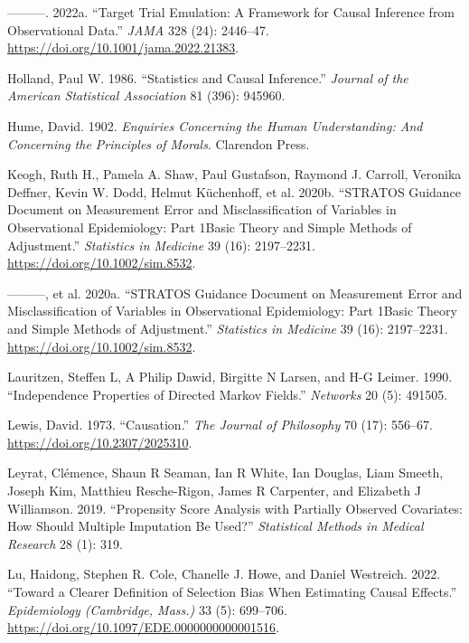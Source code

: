 \documentclass[
  singlecolumn]{report}
\newlength{\cslhangindent}
\newlength{\cslentryspacingunit} %
\newenvironment{CSLReferences}[2] %
 {%
  \setlength{\parindent}{0pt}
  \ifodd #1
  \let\oldpar\par
  \def\par{\hangindent=\cslhangindent\oldpar}
  \fi
  \setlength{\parskip}{#2\cslentryspacingunit}
 }%
 {}
\begin{document}
\begin{CSLReferences}{1}{0}
\leavevmode{}%
---------. 2022a. {``Target Trial Emulation: A Framework for Causal
Inference from Observational Data.''} \emph{JAMA} 328 (24): 2446--47.
\url{https://doi.org/10.1001/jama.2022.21383}.

\leavevmode{}%
Holland, Paul W. 1986. {``Statistics and Causal Inference.''}
\emph{Journal of the American Statistical Association} 81 (396): 945960.

\leavevmode{}%
Hume, David. 1902. \emph{Enquiries Concerning the Human Understanding:
And Concerning the Principles of Morals}. Clarendon Press.

\leavevmode{}%
Keogh, Ruth H., Pamela A. Shaw, Paul Gustafson, Raymond J. Carroll,
Veronika Deffner, Kevin W. Dodd, Helmut Küchenhoff, et al. 2020b.
{``STRATOS Guidance Document on Measurement Error and Misclassification
of Variables in Observational Epidemiology: Part 1{\textemdash}Basic
Theory and Simple Methods of Adjustment.''} \emph{Statistics in
Medicine} 39 (16): 2197--2231. \url{https://doi.org/10.1002/sim.8532}.

\leavevmode{}%
---------, et al. 2020a. {``STRATOS Guidance Document on Measurement
Error and Misclassification of Variables in Observational Epidemiology:
Part 1{\textemdash}Basic Theory and Simple Methods of Adjustment.''}
\emph{Statistics in Medicine} 39 (16): 2197--2231.
\url{https://doi.org/10.1002/sim.8532}.

\leavevmode{}%
Lauritzen, Steffen L, A Philip Dawid, Birgitte N Larsen, and H-G Leimer.
1990. {``Independence Properties of Directed Markov Fields.''}
\emph{Networks} 20 (5): 491505.

\leavevmode{}%
Lewis, David. 1973. {``Causation.''} \emph{The Journal of Philosophy} 70
(17): 556--67. \url{https://doi.org/10.2307/2025310}.

\leavevmode{}%
Leyrat, Clémence, Shaun R Seaman, Ian R White, Ian Douglas, Liam Smeeth,
Joseph Kim, Matthieu Resche-Rigon, James R Carpenter, and Elizabeth J
Williamson. 2019. {``Propensity Score Analysis with Partially Observed
Covariates: How Should Multiple Imputation Be Used?''} \emph{Statistical
Methods in Medical Research} 28 (1): 319.

\leavevmode{}%
Lu, Haidong, Stephen R. Cole, Chanelle J. Howe, and Daniel Westreich.
2022. {``Toward a Clearer Definition of Selection Bias When Estimating
Causal Effects.''} \emph{Epidemiology (Cambridge, Mass.)} 33 (5):
699--706. \url{https://doi.org/10.1097/EDE.0000000000001516}.


\end{CSLReferences}
\end{document}
